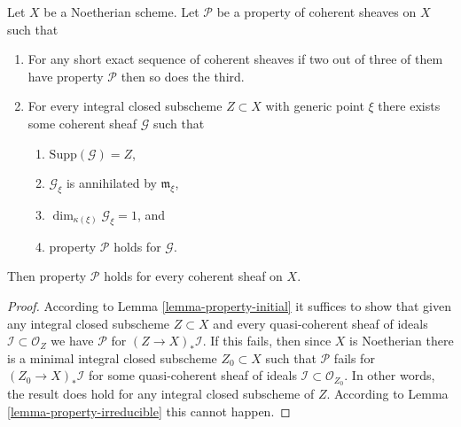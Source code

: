 \begin{lemma}
\label{lemma-property}
Let $X$ be a Noetherian scheme.
Let $\mathcal{P}$ be a property of coherent sheaves on $X$ such that
\begin{enumerate}
\item For any short exact sequence of coherent sheaves if two
out of three of them have property $\mathcal{P}$ then so does the
third.
\item For every integral closed subscheme $Z \subset X$
with generic point $\xi$ there exists
some coherent sheaf $\mathcal{G}$ such that
\begin{enumerate}
\item $\text{Supp}(\mathcal{G}) = Z$,
\item $\mathcal{G}_\xi$ is annihilated by $\mathfrak m_\xi$,
\item $\dim_{\kappa(\xi)} \mathcal{G}_\xi = 1$, and
\item property $\mathcal{P}$ holds for $\mathcal{G}$.
\end{enumerate}
\end{enumerate}
Then property $\mathcal{P}$ holds for every coherent sheaf
on $X$.
\end{lemma}

\begin{proof}
According to Lemma \ref{lemma-property-initial} it suffices to show
that given any integral closed subscheme $Z \subset X$
and every quasi-coherent sheaf of ideals
$\mathcal{I} \subset \mathcal{O}_Z$ we have
$\mathcal{P}$ for $(Z \to X)_*\mathcal{I}$.
If this fails, then since $X$ is Noetherian there
is a minimal integral closed subscheme $Z_0 \subset X$
such that $\mathcal{P}$ fails for $(Z_0 \to X)_*\mathcal{I}$ for
some quasi-coherent sheaf of ideals $\mathcal{I} \subset \mathcal{O}_{Z_0}$.
In other words, the result does hold for any integral closed
subscheme of $Z$. According to Lemma \ref{lemma-property-irreducible}
this cannot happen.
\end{proof}

